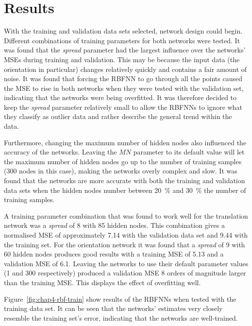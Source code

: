 \section{Results}

With the training and validation data sets selected, network design could begin. Different combinations of training parameters for both networks were tested. It was found that the \emph{spread} parameter had the largest influence over the networks' MSEs during training and validation. This may be because the input data (the orientation in particular) changes relatively quickly and contains a fair amount of noise. It was found that forcing the RBFNN to go through all the points caused the MSE to rise in both networks when they were tested with the validation set, indicating that the networks were being overfitted. It was therefore decided to keep the \emph{spread} parameter relatively small to allow the RBFNNs to ignore what they classify as outlier data and rather describe the general trend within the data. 

Furthermore, changing the maximum number of hidden nodes also influenced the accuracy of the networks. Leaving the $\mathit{MN}$ parameter to its default value will let the maximum number of hidden nodes go up to the number of training samples (300 nodes in this case), making the networks overly complex and slow. It was found that the networks are more accurate with both the training and validation data sets when the hidden nodes number between 20~\% and 30~\% the number of training samples. 

A training parameter combination that was found to work well for the translation network was a \emph{spread} of 8 with 85 hidden nodes. This combination gives a normalised MSE of approximately 7.14 with the validation data set and 9.44 with the training set. For the orientation network it was found that a \emph{spread} of 9 with 60 hidden nodes produces good results with a training MSE of 5.13 and a validation MSE of 6.1. Leaving the networks to use their default parameter values (1 and 300 respectively) produced a validation MSE 8 orders of magnitude larger than the training MSE\@. This displays the effect of overfitting well. 

Figure~\ref{fig:chap4-rbf-train} show results of the RBFNNs when tested with the training data set. It can be seen that the networks' estimates very closely resemble the training set's error, indicating that the networks are well-trained. 

